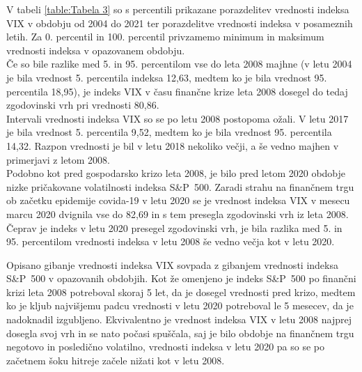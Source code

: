\documentclass[12pt,a4paper, reqno]{amsart}
\theoremstyle{definition} %
\theoremstyle{plain} %
\begin{document}
V tabeli \ref{table:Tabela 3} so s percentili prikazane porazdelitev vrednosti indeksa VIX v obdobju od 2004 do 2021 ter porazdelitve vrednosti indeksa v posameznih letih. Za 0. percentil in 100. percentil privzamemo minimum in maksimum vrednosti indeksa v opazovanem obdobju.\\

Če so bile razlike med 5. in 95. percentilom vse do leta 2008 majhne (v letu 2004 je bila vrednost 5. percentila indeksa 12,63, medtem ko je bila vrednost 95. percentila 18,95), je indeks VIX v času finančne krize leta 2008 dosegel do tedaj zgodovinski vrh pri vrednosti 80,86.\\

Intervali vrednosti indeksa VIX so se po letu 2008 postopoma ožali. V letu 2017 je bila vrednost 5. percentila 9,52, medtem ko je bila vrednost 95. percentila 14,32. Razpon vrednosti je bil v letu 2018 nekoliko večji, a še vedno majhen v primerjavi z letom 2008.\\

Podobno kot pred gospodarsko krizo leta 2008, je bilo pred letom 2020 obdobje nizke pričakovane volatilnosti indeksa S\&P~500.
Zaradi strahu na finančnem trgu ob začetku epidemije covida-19 v letu 2020 se je vrednost indeksa VIX v mesecu marcu 2020 dvignila vse do 82,69 in s tem presegla zgodovinski vrh iz leta 2008.
Čeprav je indeks v letu 2020 presegel zgodovinski vrh, je bila razlika med 5. in 95. percentilom vrednosti indeksa v letu 2008 še vedno večja kot v letu 2020.\

Opisano gibanje vrednosti indeksa VIX sovpada z gibanjem vrednosti indeksa S\&P~500 v opazovanih obdobjih. Kot že omenjeno je indeks S\&P~500 po finančni krizi leta 2008 potreboval skoraj 5 let, da je dosegel vrednosti pred krizo, medtem ko je kljub najvišjemu padcu vrednosti v letu 2020 potreboval le 5 mesecev, da je nadoknadil izgubljeno. Ekvivalentno je vrednost indeksa VIX v letu 2008 najprej dosegla svoj vrh in se nato počasi spuščala, saj je bilo obdobje na finančnem trgu negotovo in posledično volatilno, vrednosti indeksa v letu 2020 pa so se po začetnem šoku hitreje začele nižati kot v letu 2008. 
\end{document}
